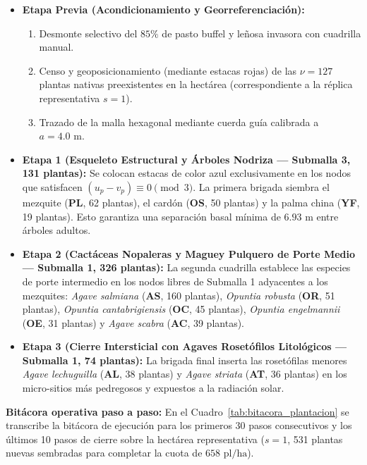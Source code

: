 \documentclass[11pt,a4paper]{article}
\begin{document}
\begin{itemize}[leftmargin=1.5em]
    \item \textbf{Etapa Previa (Acondicionamiento y Georreferenciación):}
    \begin{enumerate}
        \item Desmonte selectivo del $85\%$ de pasto buffel y leñosa invasora con cuadrilla manual.
        \item Censo y geoposicionamiento (mediante estacas rojas) de las $\nu = 127$ plantas nativas preexistentes en la hectárea (correspondiente a la réplica representativa $s=1$).
        \item Trazado de la malla hexagonal mediante cuerda guía calibrada a $a = 4.0\text{ m}$.
    \end{enumerate}
    \item \textbf{Etapa 1 (Esqueleto Estructural y Árboles Nodriza — Submalla 3, 131 plantas):}
    Se colocan estacas de color azul exclusivamente en los nodos que satisfacen $(u_p - v_p) \equiv 0 \pmod 3$. La primera brigada siembra el mezquite (\textbf{PL}, 62 plantas), el cardón (\textbf{OS}, 50 plantas) y la palma china (\textbf{YF}, 19 plantas). Esto garantiza una separación basal mínima de $6.93\text{ m}$ entre árboles adultos.
    \item \textbf{Etapa 2 (Cactáceas Nopaleras y Maguey Pulquero de Porte Medio — Submalla 1, 326 plantas):}
    La segunda cuadrilla establece las especies de porte intermedio en los nodos libres de Submalla 1 adyacentes a los mezquites: \textit{Agave salmiana} (\textbf{AS}, 160 plantas), \textit{Opuntia robusta} (\textbf{OR}, 51 plantas), \textit{Opuntia cantabrigiensis} (\textbf{OC}, 45 plantas), \textit{Opuntia engelmannii} (\textbf{OE}, 31 plantas) y \textit{Agave scabra} (\textbf{AC}, 39 plantas).
    \item \textbf{Etapa 3 (Cierre Intersticial con Agaves Rosetófilos Litológicos — Submalla 1, 74 plantas):}
    La brigada final inserta las rosetófilas menores \textit{Agave lechuguilla} (\textbf{AL}, 38 plantas) y \textit{Agave striata} (\textbf{AT}, 36 plantas) en los micro-sitios más pedregosos y expuestos a la radiación solar.
\end{itemize}

\textbf{Bitácora operativa paso a paso:} En el Cuadro~\ref{tab:bitacora_plantacion} se transcribe la bitácora de ejecución para los primeros 30 pasos consecutivos y los últimos 10 pasos de cierre sobre la hectárea representativa ($s=1$, 531 plantas nuevas sembradas para completar la cuota de $658\text{ pl/ha}$).
\end{document}
